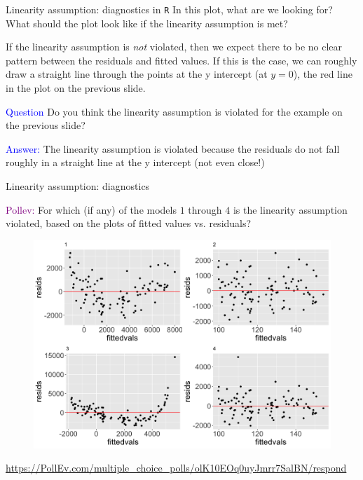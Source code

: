 \documentclass[10pt,t]{beamer}
\begin{document}
\begin{frame}{Linearity assumption: diagnostics in \texttt{R}}
In this plot, what are we looking for? What should the plot look like if the linearity assumption is met?\pause

\vspace{0.3cm}

If the linearity assumption is \textit{not} violated, then we expect there to be no clear pattern between the residuals and fitted values. If this is the case, we can roughly draw a straight line through the points at the y intercept (at $y = 0$), the red line in the plot on the previous slide. 

\vspace{0.3cm}

\textcolor{blue}{Question} Do you think the linearity assumption is violated for the example on the previous slide? \pause

\vspace{0.3cm}

\textcolor{blue}{Answer:} The linearity assumption is violated because the residuals do not fall roughly in a straight line at the y intercept (not even close!)

\end{frame}


\begin{frame}{Linearity assumption: diagnostics}
	\vspace{-5 mm}
	
\textcolor{purple}{Pollev:} For which (if any) of the models $1$ through $4$ is the linearity assumption violated, based on the plots of fitted values vs. residuals?

\begin{figure}
\centering \includegraphics[scale=0.25]{figures/lin_diagnostics_example.png}
\end{figure}

\footnotesize{\url{https://PollEv.com/multiple_choice_polls/olK10EOq0uyJmrr7SalBN/respond}}
\end{frame}
\end{document}
